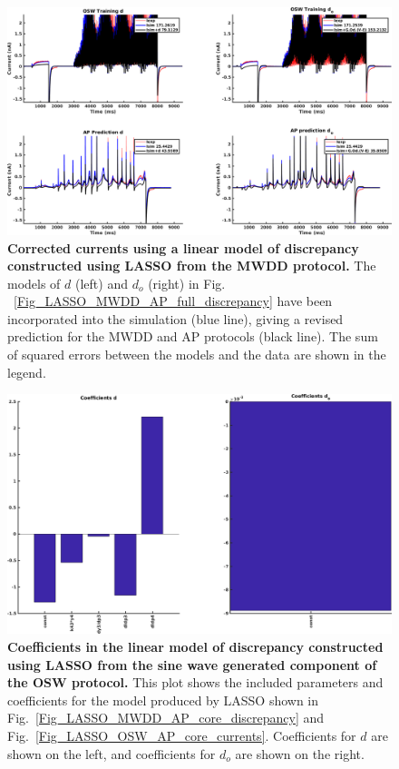 \documentclass[11pt,a4paper,oneside]{article}
\begin{document}
\begin{figure}[hb]
\begin{center}
\includegraphics[scale=0.42]{Figures/LASSO_OSW_AP_full_currents.png}
\caption{\textbf{Corrected currents using a linear model of discrepancy constructed using LASSO from the MWDD protocol.} The models of $d$ (left) and $d_o$ (right) in Fig. ~\ref{Fig_LASSO_MWDD_AP_full_discrepancy} have been incorporated into the simulation (blue line), giving a revised prediction for the MWDD and AP protocols (black line). The sum of squared errors between the models and the data are shown in the legend.}
\label{Fig_LASSO_MWDD_AP_full_currents}
\end{center}
\end{figure}

\clearpage

\begin{figure}[t]
\begin{center}
\includegraphics[scale=0.42]{Figures/LASSO_OSW_AP_full_coefficients.png}
\caption{\textbf{Coefficients in the linear model of discrepancy constructed using LASSO from the sine wave generated component of the OSW protocol.} This plot shows the included parameters and coefficients for the model produced by LASSO shown in Fig.~\ref{Fig_LASSO_MWDD_AP_core_discrepancy} and Fig.~\ref{Fig_LASSO_OSW_AP_core_currents}. Coefficients for $d$ are shown on the left, and coefficients for $d_o$ are shown on the right.} 
\label{Fig_LASSO_OSW_AP_core_coefficients}
\end{center}
\end{figure}
\end{document}
